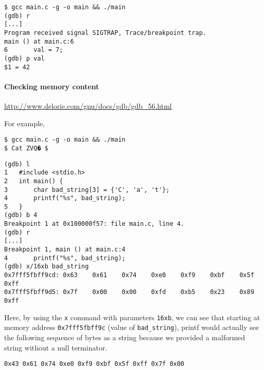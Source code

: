 \begin{verbatim}
$ gcc main.c -g -o main && ./main
(gdb) r
[...]
Program received signal SIGTRAP, Trace/breakpoint trap.
main () at main.c:6
6       val = 7;
(gdb) p val
$1 = 42
\end{verbatim}

\paragraph{Checking memory content}\label{checking-memory-content}

\url{http://www.delorie.com/gnu/docs/gdb/gdb_56.html}

For example,

\begin{Shaded}
\end{Shaded}

\begin{verbatim}
$ gcc main.c -g -o main && ./main
$ Cat ZVQ� $
\end{verbatim}

\begin{verbatim}
(gdb) l
1   #include <stdio.h>
2   int main() {
3       char bad_string[3] = {'C', 'a', 't'};
4       printf("%s", bad_string);
5   }
(gdb) b 4
Breakpoint 1 at 0x100000f57: file main.c, line 4.
(gdb) r
[...]
Breakpoint 1, main () at main.c:4
4       printf("%s", bad_string);
(gdb) x/16xb bad_string
0x7fff5fbff9cd: 0x63    0x61    0x74    0xe0    0xf9    0xbf    0x5f    0xff
0x7fff5fbff9d5: 0x7f    0x00    0x00    0xfd    0xb5    0x23    0x89    0xff
\end{verbatim}

Here, by using the \texttt{x} command with parameters \texttt{16xb}, we
can see that starting at memory address \texttt{0x7fff5fbff9c} (value of
\texttt{bad\_string}), printf would actually see the following sequence
of bytes as a string because we provided a malformed string without a
null terminator.

\texttt{0x43\ 0x61\ 0x74\ 0xe0\ 0xf9\ 0xbf\ 0x5f\ 0xff\ 0x7f\ 0x00}
